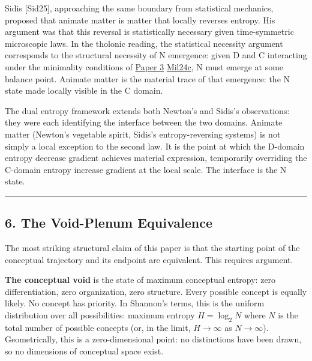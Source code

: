 \documentclass[
  11pt,
  letterpaper,
]{article}
\begin{document}
Sidis {[}Sid25{]}, approaching the same boundary from statistical
mechanics, proposed that animate matter is matter that locally reverses
entropy. His argument was that this reversal is statistically necessary
given time-symmetric microscopic laws. In the tholonic reading, the
statistical necessity argument corresponds to the structural necessity
of N emergence: given D and C interacting under the minimality
conditions of
\href{https://github.com/baardev/truevalue/blob/main/docnav/Research/papers/3_minimal-recursive-triadic-framework/3_minimal-recursive-triadic-framework.pdf}{Paper
3}
\href{https://github.com/baardev/truevalue/blob/main/docnav/Research/papers/3_minimal-recursive-triadic-framework/3_minimal-recursive-triadic-framework.pdf}{Mil24c},
N must emerge at some balance point. Animate matter is the material
trace of that emergence: the N state made locally visible in the C
domain.

The dual entropy framework extends both Newton's and Sidis's
observations: they were each identifying the interface between the two
domains. Animate matter (Newton's vegetable spirit, Sidis's
entropy-reversing systems) is not simply a local exception to the second
law. It is the point at which the D-domain entropy decrease gradient
achieves material expression, temporarily overriding the C-domain
entropy increase gradient at the local scale. The interface is the N
state.

\begin{center}\rule{0.5\linewidth}{0.5pt}\end{center}

\subsection{6. The Void-Plenum
Equivalence}\label{the-void-plenum-equivalence}

The most striking structural claim of this paper is that the starting
point of the conceptual trajectory and its endpoint are equivalent. This
requires argument.

\textbf{The conceptual void} is the state of maximum conceptual entropy:
zero differentiation, zero organization, zero structure. Every possible
concept is equally likely. No concept has priority. In Shannon's terms,
this is the uniform distribution over all possibilities: maximum entropy
\(H = \log_2 N\) where \(N\) is the total number of possible concepts
(or, in the limit, \(H \to \infty\) as \(N \to \infty\)). Geometrically,
this is a zero-dimensional point: no distinctions have been drawn, so no
dimensions of conceptual space exist.
\end{document}
